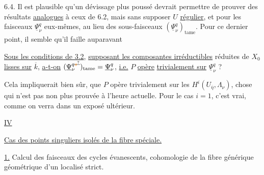 6.4. Il est plausible qu'un dévissage plus poussé devrait permettre de prouver des résultats \uline{analogues} à ceux de 6.2, mais sans supposer $U$ \uline{régulier}, et pour les faisceaux $\underline{\Psi}_\nu^q$ eux-mêmes, au lieu des sous-faisceaux $(\underline{\Psi}_\nu^q)_{\mathrm{tame}}$. Pour ce dernier point, il semble qu'il faille auparavant   

\uline{Sous les conditions de 3.2}, \uline{supposant les composantes irréductibles}  réduites de $X_0$ \uline{lisses sur} $\overline{k}$,   \uline{a-t-on} $(\underline{\Psi}_\nu^{q\deleted{\unsure{s}}})_{\mathrm{tame}}=\underline{\Psi}_\nu^q$, \uline{i.e.} $P$ \uline{opère} \uline{trivialement sur}  $\underline{\Psi}_\nu^q$ ? 

Cela impliquerait bien sûr,  que $P$ opère trivialement sur les $H^i(U_{\overline\eta},\Lambda_\nu)$, chose qui n'est pas non plus prouvée à l'heure actuelle.  Pour le cas $i=1$, c'est vrai,  comme on verra dans un exposé ultérieur.



\uline{IV}

 \uline{Cas des points singuliers isolés de la fibre spéciale.}

\uline{1.} Calcul   des faisceaux des cycles évanescents,   cohomologie de la fibre générique géométrique d'un localisé strict.


